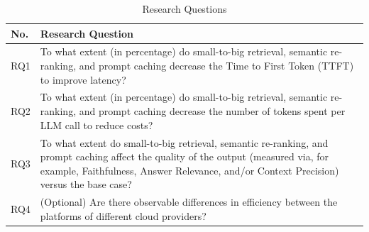 \documentclass[12pt,a4paper,english,oneside]{article}
\begin{document}
\begin{table}[h!]
\centering
\caption{Research Questions}
\label{table:research_questions}
\begin{tabular}{|l|p{}|}
\hline
\textbf{No.} & \textbf{Research Question} \\ \hline
RQ1 & To what extent (in percentage) do small-to-big retrieval, semantic re-ranking, and prompt caching decrease the Time to First Token (TTFT) to improve latency? \\ \hline
RQ2 & To what extent (in percentage) do small-to-big retrieval, semantic re-ranking, and prompt caching decrease the number of tokens spent per LLM call to reduce costs? \\ \hline
RQ3 & To what extent do small-to-big retrieval, semantic re-ranking, and prompt caching affect the quality of the output (measured via, for example, Faithfulness, Answer Relevance, and/or Context Precision) versus the base case? \\ \hline
RQ4 & (Optional) Are there observable differences in efficiency between the platforms of different cloud providers? \\ \hline
\end{tabular}
\end{table}
%
%
\end{document}
